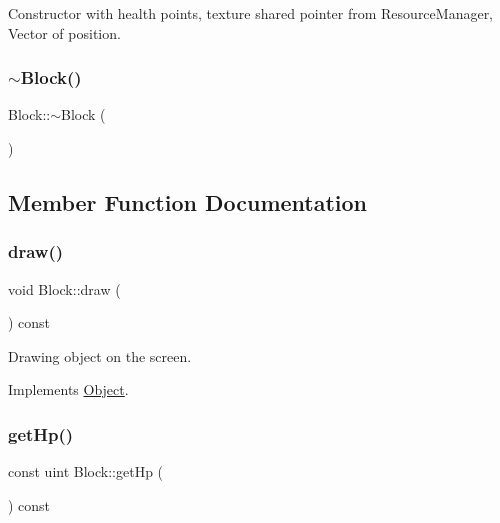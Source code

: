 Constructor with health points, texture shared pointer from Resource\+Manager, Vector of position. 

\mbox{\label{class_block_a19d1bd0e1cef6a865ed2745a2e648405}} 
\subsubsection{\texorpdfstring{$\sim$Block()}{~Block()}}
{\footnotesize\ttfamily Block\+::$\sim$\+Block (\begin{DoxyParamCaption}{ }\end{DoxyParamCaption})\hspace{0.3cm}{\ttfamily [inline]}}



\subsection{Member Function Documentation}
\mbox{\label{class_block_a3a41cfe615a31b5c4b824004d248ba65}} 
\subsubsection{\texorpdfstring{draw()}{draw()}}
{\footnotesize\ttfamily void Block\+::draw (\begin{DoxyParamCaption}\item[{\mbox{\hyperlink{class_game_engine}{Game\+Engine}} $\ast$}]{ }\end{DoxyParamCaption}) const\hspace{0.3cm}{\ttfamily [virtual]}}



Drawing object on the screen. 



Implements \mbox{\hyperlink{class_object_af9862406dcd271bd45580737df468af4}{Object}}.

\mbox{\label{class_block_a01788216d95ab7230287cb0d58a19c34}} 
\subsubsection{\texorpdfstring{getHp()}{getHp()}}
{\footnotesize\ttfamily const uint Block\+::get\+Hp (\begin{DoxyParamCaption}{ }\end{DoxyParamCaption}) const\hspace{0.3cm}{\ttfamily [inline]}}

